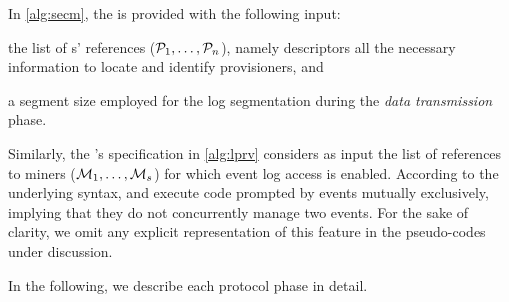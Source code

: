 \begin{newj}
In \cref{alg:secm}, the  is provided with the following input:
\begin{inparadesc}
    \item the list of s' references ($\mathcal{P}_1, \ldots, \mathcal{P}_n$), namely descriptors all the necessary information to locate and identify provisioners, and 
    \item a segment size {\SegSize} employed for the log segmentation during the \textit{data transmission} phase. 
\end{inparadesc}
Similarly, the 's specification in \cref{alg:lprv} considers as input the list of references to miners ($\mathcal{M}_1, \ldots, \mathcal{M}_s$) for which event log access is enabled. According to the underlying syntax, {\SecM} and {\LPrv} execute code prompted by events mutually exclusively, implying that they do not concurrently manage two events. For the sake of clarity, we omit any explicit representation of this feature in the pseudo-codes under discussion.
\end{newj}

In the following, we describe each protocol phase in detail.

